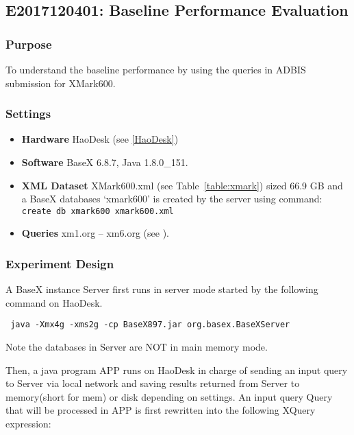 \subsection{E2017120401: Baseline Performance Evaluation}
 
\subsubsection{Purpose}
To understand the baseline performance by using
the queries in ADBIS submission for XMark600.
 
\subsubsection{Settings} 

\begin{itemize}

\item \textbf{Hardware} HaoDesk (see \ref{HaoDesk})\\
\item \textbf{Software} BaseX 6.8.7, Java 1.8.0\_151.\\
\item \textbf{XML Dataset} XMark600.xml (see Table~\ref{table:xmark}) sized 66.9 GB and
a BaseX databases `xmark600' is created by the server using command:\\
\verb|create db xmark600 xmark600.xml|
\item \textbf{Queries} xm1.org -- xm6.org (see ).

\end{itemize}


\subsubsection{Experiment Design}  

A BaseX instance Server first runs in server mode started by the following
command on HaoDesk.

\verb| java -Xmx4g -xms2g -cp BaseX897.jar org.basex.BaseXServer|

Note the databases in Server are NOT in main memory mode.

Then, a java program APP runs on HaoDesk in charge of sending an input query to
Server via local network and saving results returned from Server to memory(short
for mem) or disk depending on settings. An input query Query that will be
processed in APP is first rewritten into the following XQuery expression:

